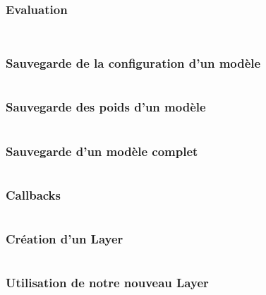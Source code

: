 \begin{frame}
  \frametitle{Evaluation}
  \inputminted[linenos,fontsize=\small,bgcolor=pythonbg]{python}{code/tf-keras-predict.py}
  \inputminted[linenos,fontsize=\small,bgcolor=returnbg]{text}{code/tf-keras-predict.txt}
\end{frame}

\begin{frame}
  \frametitle{Sauvegarde de la configuration d'un modèle}
  \inputminted[linenos,fontsize=\small,bgcolor=pythonbg]{python}{code/tf-keras-save-config.py}
\end{frame}

\begin{frame}
  \frametitle{Sauvegarde des poids d'un modèle}
  \inputminted[linenos,fontsize=\small,bgcolor=pythonbg]{python}{code/tf-keras-save-weights.py}
\end{frame}

\begin{frame}
  \frametitle{Sauvegarde d'un modèle complet}
  \inputminted[linenos,fontsize=\small,bgcolor=pythonbg]{python}{code/tf-keras-save-all.py}
\end{frame}

\begin{frame}
  \frametitle{Callbacks}
  \inputminted[linenos,fontsize=\small,bgcolor=pythonbg]{python}{code/tf-keras-callbacks.py}
\end{frame}

\begin{frame}
  \frametitle{Création d'un Layer}
  \inputminted[linenos,fontsize=\small,bgcolor=pythonbg]{python}{code/tf-keras-custom-layer.py}
\end{frame}

\begin{frame}
  \frametitle{Utilisation de notre nouveau Layer}
  \inputminted[linenos,fontsize=\small,bgcolor=pythonbg]{python}{code/tf-keras-custom-layer-use.py}
\end{frame}

